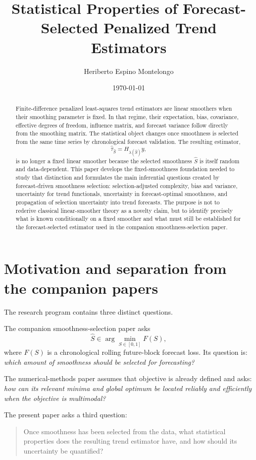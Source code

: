 \documentclass[11pt]{article}
\title{Statistical Properties of Forecast-Selected Penalized Trend Estimators}
\author{Heriberto Espino Montelongo}
\date{\today}
\begin{document}
\maketitle

\begin{abstract}
Finite-difference penalized least-squares trend estimators are linear smoothers
when their smoothing parameter is fixed. In that regime, their expectation,
bias, covariance, effective degrees of freedom, influence matrix, and forecast
variance follow directly from the smoothing matrix. The statistical object
changes once smoothness is selected from the same time series by chronological
forecast validation. The resulting estimator,
\[
\widehat\tau_{\widehat S}
=
H_{\lambda(\widehat S)}y,
\]
is no longer a fixed linear smoother because the selected smoothness
\(\widehat S\) is itself random and data-dependent. This paper develops the
fixed-smoothness foundation needed to study that distinction and formulates the
main inferential questions created by forecast-driven smoothness selection:
selection-adjusted complexity, bias and variance, uncertainty for trend
functionals, uncertainty in forecast-optimal smoothness, and propagation of
selection uncertainty into trend forecasts. The purpose is not to rederive
classical linear-smoother theory as a novelty claim, but to identify precisely
what is known conditionally on a fixed smoother and what must still be
established for the forecast-selected estimator used in the companion
smoothness-selection paper.
\end{abstract}

\section{Motivation and separation from the companion papers}

The research program contains three distinct questions.

The companion smoothness-selection paper asks
\[
\widehat S
\in
\arg\min_{S\in[0,1]}F(S),
\]
where \(F(S)\) is a chronological rolling future-block forecast loss. Its
question is: \emph{which amount of smoothness should be selected for
forecasting?}

The numerical-methods paper assumes that objective is already defined and asks:
\emph{how can its relevant minima and global optimum be located reliably and
efficiently when the objective is multimodal?}

The present paper asks a third question:
\begin{quote}
Once smoothness has been selected from the data, what statistical properties
does the resulting trend estimator have, and how should its uncertainty be
quantified?
\end{quote}
\end{document}
